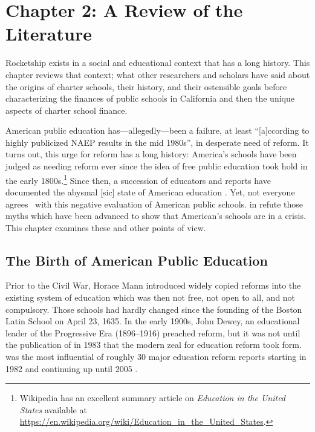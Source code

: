 \chapter{Chapter 2: A Review of the Literature}\label{ch:litreview}\indent%
Rocketship exists in a social and educational context that has a long history. This chapter reviews that context; what other researchers and scholars have said about the origins of charter schools, their history, and their ostensible goals before characterizing the finances of public schools in California and then the unique aspects of charter school finance. 

 American public education has—allegedly—been a failure, at least ``[a]ccording to highly publicized NAEP results in the mid 1980s'', in desperate need of reform. It turns out, this urge for reform has a long history: America's schools have been judged as needing reform ever since the idea of free public education took hold in the early 1800s.\footnote{Wikipedia has an excellent summary article on \textit{Education in the United States} available at \url{https://en.wikipedia.org/wiki/Education_in_the_United_States}.} Since then, a succession of educators and reports have documented the abysmal [sic] state of American education \parencite{Gove.Meier2000}. Yet, not everyone agrees  with this negative evaluation of American public schools. \textcite{Berliner.Glass2014} in  refute those myths which have been advanced to show that American's schools are in a crisis. This chapter examines these and other points of view.

\section{The Birth of American Public Education}\label{sec:birth-amer-publ}\indent%

Prior to the Civil War, Horace Mann introduced widely copied reforms \parencite%
{Pulliam.VanPatten2007} into the existing system of education which was then not free, not open to all, and not compulsory. Those schools had hardly changed since the founding of the Boston Latin School on April 23, 1635. In the early 1900s, John Dewey, an educational leader of the Progressive Era (1896–1916) preached reform, but it was not until the publication of  in 1983 that the modern zeal for education reform took form.  was the most influential of roughly 30  major education reform reports starting in 1982 and continuing up until 2005 \textcite[252]{Pulliam.VanPatten2007}.


